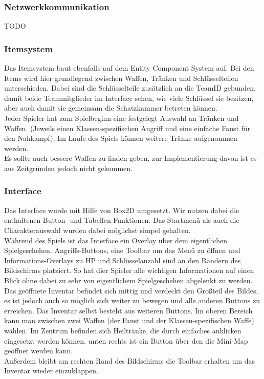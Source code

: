 \documentclass[10pt,a4paper,notitlepage]{scrreprt}
\begin{document}
		\subsubsection{Netzwerkkommunikation}
		TODO
		
		\subsubsection{Itemsystem}
		
		Das Itemsystem baut ebenfalls auf dem Entity Component System auf. Bei den Items wird hier grundlegend zwischen Waffen, Tränken und Schlüsselteilen unterschieden. Dabei sind die Schlüsselteile zusätzlich an die TeamID gebunden, damit beide Teammitglieder im Interface sehen, wie viele Schlüssel sie besitzen, aber auch damit sie gemeinsam die Schatzkammer betreten können.\\
		Jeder Spieler hat zum Spielbeginn eine festgelegt Auswahl an Tränken und Waffen. (Jeweils einen Klassen-spezifischen Angriff und eine einfache Faust für den Nahkampf). Im Laufe des Spiels können weitere Tränke aufgenommen werden.\\
		Es sollte auch bessere Waffen zu finden geben, zur Implementierung davon ist es aus Zeitgründen jedoch nicht gekommen.\\
		
		\subsubsection{Interface}
		
		Das Interface wurde mit Hilfe von Box2D umgesetzt. Wir nutzen dabei die enthaltenen Button- und Tabellen-Funktionen. Das Startmenü als auch die Charakterauswahl wurden dabei möglichst simpel gehalten.\\
		Während des Spiels ist das Interface ein Overlay über dem eigentlichen Spielgeschehen. Angriffs-Buttons, eine Toolbar um das Menü zu öffnen und Informations-Overlays zu HP und Schlüsselanzahl sind an den Rändern des Bildschirms platziert. So hat dier Spieler alle wichtigen Informationen auf einen Blick ohne dabei zu sehr von eigentlichem Spielgeschehen abgelenkt zu werden.\\
		Das geöffnete Inventar befindet sich mittig und verdeckt den Großteil des Bildes, es ist jedoch auch so möglich sich weiter zu bewegen und alle anderen Buttons zu erreichen. Das Inventar selbst besteht aus weiteren Buttons. Im oberen Bereich kann man zwischen zwei Waffen (der Faust und der Klassen-spezifischen Waffe) wählen. Im Zentrum befinden sich Heiltränke, die durch einfaches anklicken eingesetzt werden können. unten rechts ist ein Button über den die Mini-Map geöffnet werden kann.\\
		Außerdem bleibt am rechten Rand des Bildschirms die Toolbar erhalten um das Inventar wieder einzuklappen.\\
\end{document}
